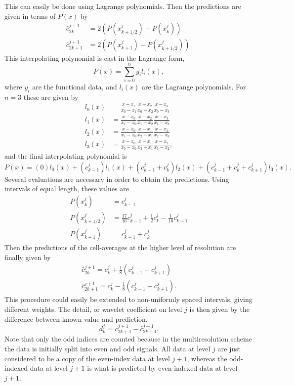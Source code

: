 \documentclass[10.5pt]{article}
\begin{document}
This can easily be done using Lagrange polynomials. Then the predictions are given in terms of $P(x)$ by
\begin{align}
	\hat{c}^{j+1}_{2k} &= 2 \left( P(x^{j}_{k+1/2}) - P(x^{j}_{k}) \right) \\
	\hat{c}^{j+1}_{2k+1} &= 2 \left( P(x^{j}_{k+1}) - P(x^{j}_{k+1/2}) \right).
\end{align}
This interpolating polynomial is cast in the Lagrange form,
\begin{equation}
P(x) = \sum_{i=0}^{n} y_{i} l_{i}(x),
\end{equation}
where $y_{i}$ are the functional data, and $l_{i}(x)$ are the Lagrange polynomials. For $n=3$ these
are given by
\begin{align}
    l_{0}(x) &= \frac{x-x_1}{x_0-x_1} \frac{x-x_2}{x_0-x_2} \frac{x-x_3}{x_0-x_3} \\
    l_{1}(x) &= \frac{x-x_0}{x_1-x_0} \frac{x-x_2}{x_1-x_2} \frac{x-x_3}{x_1-x_3} \\
    l_{2}(x) &= \frac{x-x_0}{x_1-x_0} \frac{x-x_1}{x_2-x_1} \frac{x-x_3}{x_2-x_3} \\
    l_{3}(x) &= \frac{x-x_0}{x_3-x_0} \frac{x-x_1}{x_3-x_1} \frac{x-x_2}{x_3-x_2},
\end{align}
and the final interpolating polynomial is
\begin{equation}
	P(x) = (0) l_{0}(x) + ( c^{j}_{k-1} ) l_{1}(x) + ( c^{j}_{k-1} + c^{j}_{k} ) l_{2}(x)
		+ ( c^{j}_{k-1} + c^{j}_{k} + c^{j}_{k+1} ) l_{3}(x).
\end{equation}
Several evaluations are necessary in order to obtain the predictions. Using intervals of equal length, these values are
\begin{align}
	P(x^{j}_{k}) &= c^{j}_{k-1} \\
	P(x^{j}_{k+1/2}) &= \frac{17}{16} c^{j}_{k-1} + \frac{1}{2} c^{j}_{k} - \frac{1}{16} c^{j}_{k+1} \\
	P(x^{j}_{k+1}) &= c^{j}_{k-1} + c^{j}_{k}.
\end{align}
Then the predictions of the cell-averages at the higher level of resolution are finally given by
\begin{align}
	\hat{c}^{j+1}_{2k} = c^{j}_{k} + \frac{1}{8} \left( c^{j}_{k-1} - c^{j}_{k+1} \right) \\
	\hat{c}^{j+1}_{2k+1} = c^{j}_{k} - \frac{1}{8} \left( c^{j}_{k-1} - c^{j}_{k+1} \right).
\end{align}
This procedure could easily be extended to non-uniformly spaced intervals, giving different weights. The detail,
or wavelet coefficient on level $j$ is then given by the difference between known value and prediction,
\begin{equation}
	d^{j}_{k} = c^{j+1}_{2k+1} - \hat{c}^{j+1}_{2k+1}.
\end{equation}
Note that only the odd indices are counted because in the multiresolution scheme the data is initially split into even
and odd signals. All data at level $j$ are just considered to be a copy of the even-index data at level $j+1$, whereas
the odd-indexed data at level $j+1$ is what is predicted by even-indexed data at level $j+1$.
\end{document}
